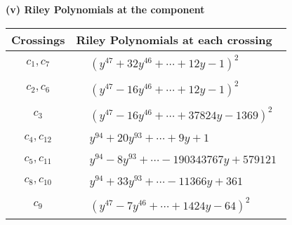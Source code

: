 \documentclass[1p]{elsarticle_modified}
\theoremstyle{definition}
\begin{document}
\newpage\renewcommand{\arraystretch}{1}
\flushleft \textbf{(v) Riley Polynomials at the component}\newline \\
\begin{tabular}{m{50pt}|m{274pt}}
Crossings & \hspace{64pt}Riley Polynomials at each crossing \\
\hline $$\begin{aligned}c_{1},c_{7}\end{aligned}$$&$\begin{aligned}
&(y^{47}+32 y^{46}+\cdots+12 y-1)^{2}
\end{aligned}$\\
\hline $$\begin{aligned}c_{2},c_{6}\end{aligned}$$&$\begin{aligned}
&(y^{47}-16 y^{46}+\cdots+12 y-1)^{2}
\end{aligned}$\\
\hline $$\begin{aligned}c_{3}\end{aligned}$$&$\begin{aligned}
&(y^{47}-16 y^{46}+\cdots+37824 y-1369)^{2}
\end{aligned}$\\
\hline $$\begin{aligned}c_{4},c_{12}\end{aligned}$$&$\begin{aligned}
&y^{94}+20 y^{93}+\cdots+9 y+1
\end{aligned}$\\
\hline $$\begin{aligned}c_{5},c_{11}\end{aligned}$$&$\begin{aligned}
&y^{94}-8 y^{93}+\cdots-190343767 y+579121
\end{aligned}$\\
\hline $$\begin{aligned}c_{8},c_{10}\end{aligned}$$&$\begin{aligned}
&y^{94}+33 y^{93}+\cdots-11366 y+361
\end{aligned}$\\
\hline $$\begin{aligned}c_{9}\end{aligned}$$&$\begin{aligned}
&(y^{47}-7 y^{46}+\cdots+1424 y-64)^{2}
\end{aligned}$\\
\hline
\end{tabular}\\~\\
\end{document}
